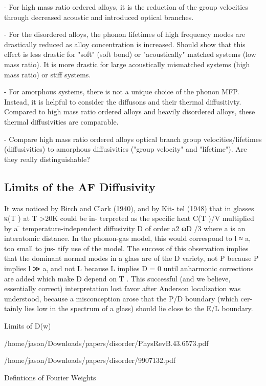 \documentclass[aps,prb,preprint,superscriptaddress,amsmath,amssymb,floatfix]{revtex4}
\begin{document}
- For high mass ratio ordered alloys, it is the reduction of the group velocities through decreased acoustic and introduced optical branches. 

- For the disordered alloys, the phonon lifetimes of high frequency modes are drastically reduced as alloy concentration is increased.  Should show that this effect is less drastic for "soft" (soft bond) or "acoustically" matched systems (low mass ratio). It is more drastic for large acoustically mismatched systems (high mass ratio) or stiff systems.

- For amorphous systems, there is not a unique choice of the phonon MFP. Instead, it is helpful to consider the diffusons and their thermal diffusitivty. Compared to high mass ratio ordered alloys and heavily disordered alloys, these thermal diffusivities are comparable.  

- Compare high mass ratio ordered alloys optical branch group velocities/lifetimes (diffusivities) to amorphous diffusivities ("group velocity" and "lifetime"). Are they really distinguishable?


\subsection{\label{S-Motivation-Amorphous}Limits of the AF Diffusivity}

It was noticed by Birch and Clark (1940), and by Kit-
tel (1948) that in glasses κ(T ) at T >20K could be in-
terpreted as the specific heat C(T )/V multiplied by a
 ̄
temperature-independent diffusivity D of order a2 ωD /3
where a is an interatomic distance. In the phonon-gas
model, this would correspond to l ≈ a, too small to jus-
tify use of the model. The success of this observation
implies that the dominant normal modes in a glass are of
the D variety, not P because P implies l ≫ a, and not L
because L implies D = 0 until anharmonic corrections are
added which make D depend on T . This successful (and
we believe, essentially correct) interpretation lost favor
after Anderson localization was understood, because a
misconception arose that the P/D boundary (which cer-
tainly lies low in the spectrum of a glass) should lie close
to the E/L boundary.

Limits of D(w)

/home/jason/Downloads/papers/disorder/PhysRevB.43.6573.pdf


/home/jason/Downloads/papers/disorder/9907132.pdf

Defintions of Fourier Weights
\end{document}
